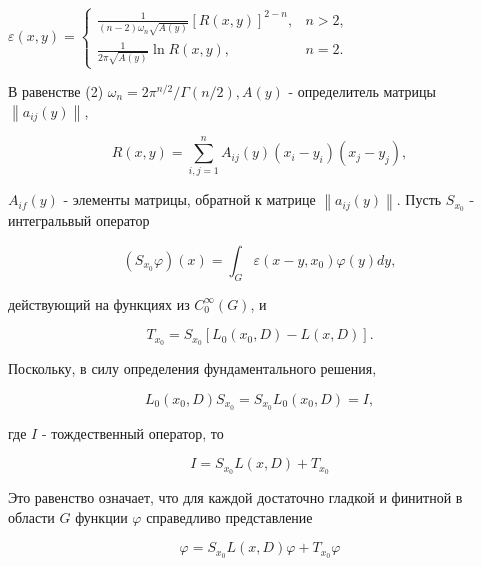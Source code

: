 \documentclass[10pt]{article}
\begin{document}
$\varepsilon(x, y)= \begin{cases}\frac{1}{(n-2) \omega_{n} \sqrt{A(y)}}[R(x, y)]^{2-n}, & n>2, \\ \frac{1}{2 \pi \sqrt{A(y)}} \ln R(x, y), & n=2 .\end{cases}$



В равенстве (2) $\omega_{n}=2 \pi^{n / 2} / \Gamma(n / 2), A(y)$ - определитель матрицы $\left\|a_{i j}(y)\right\|$,



\[

R(x, y)=\sum_{i, j=1}^{n} A_{i j}(y)\left(x_{i}-y_{i}\right)\left(x_{j}-y_{j}\right),

\]



$A_{i f}(y)$ - элементы матрицы, обратной к матрице $\left\|a_{i j}(y)\right\|$. Пусть $S_{x_{0}}$ - интегральвый оператор



\[

\left(S_{x_{0}} \varphi\right)(x)=\int_{G} \varepsilon\left(x-y, x_{0}\right) \varphi(y) d y,

\]



действующий на функциях из $C_{0}^{\infty}(G)$, и



\[

T_{x_{0}}=S_{x_{0}}\left[L_{0}\left(x_{0}, D\right)-L(x, D)\right] .

\]



Поскольку, в силу определения фундаментального решения,



\[

L_{0}\left(x_{0}, D\right) S_{x_{0}}=S_{x_{0}} L_{0}\left(x_{0}, D\right)=I,

\]



где $I$ - тождественный оператор, то



\[

I=S_{x_{0}} L(x, D)+T_{x_{0}}

\]



Это равенство означает, что для каждой достаточно гладкой и финитной в области $G$ функции $\varphi$ справедливо представление



\[

\varphi=S_{x_{0}} L(x, D) \varphi+T_{x_{0}} \varphi

\]
\end{document}
